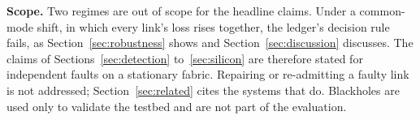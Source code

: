 \textbf{Scope.} Two regimes are out of scope for the headline claims. Under a common-mode shift, in which every link's loss rises together, the ledger's decision rule fails, as Section~\ref{sec:robustness} shows and Section~\ref{sec:discussion} discusses. The claims of Sections~\ref{sec:detection} to~\ref{sec:silicon} are therefore stated for independent faults on a stationary fabric. Repairing or re-admitting a faulty link is not addressed; Section~\ref{sec:related} cites the systems that do. Blackholes are used only to validate the testbed and are not part of the evaluation.
